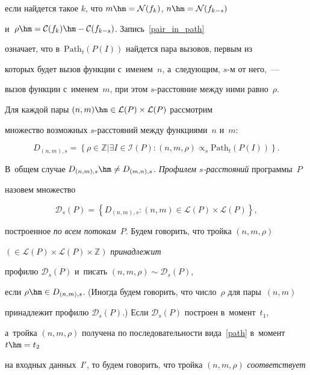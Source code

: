 если найдется такое $k$, что $m\hm=\mathcal{N}(f_k)$, $n\hm=\mathcal{N}(f_{k-s})$ 

и~$\rho\hm=\mathcal{C}(f_{k})\hm-\mathcal{C}(f_{k-s})$. Запись~\eqref{pair_in_path} 

означает, что в~$\mathrm{Path}_t(P(I))$ найдется пара вызовов, первым из 

которых будет вызов функции с~именем~$n$, а~сле\-ду\-ющим, $s$-м от него,~--- 

вызов функции с~именем~$m$, при этом $s$-рас\-сто\-яние между ними равно~$\rho$. 

Для каждой пары $(n,m)\hm\in \mathcal{L}(P)\times \mathcal{L}(P)$ рассмотрим  

 множество возможных $s$-рас\-сто\-яний между функ\-циями~$n$ и~$m$:

$$

D_{(n,m),s}=\left\{\rho\in\mathbb{Z}|\exists I\in\mathcal{I}(P): (n,m,\rho)\propto_s 

\mathrm{Path}_t(P(I))\right\}.

$$

  В~общем случае $D_{(n,m),s}\hm\neq D_{(m,n),s}$. \textit{Профилем $s$-рас\-сто\-яний} программы~$P$ 

 назовем множество 

\begin{equation}

\label{profile}

\mathcal{D}_{s}(P)=\left\{D_{(n,m),s}:(n,m)\in \mathcal{L}(P)\times \mathcal{L}(P)\right\},

\end{equation}

построенное \textit{по всем потокам}~$P$. Будем говорить, что тройка $(n,m,\rho)$\linebreak 

$(\in \mathcal{L}(P)\times\mathcal{L}(P)\times \mathbb{Z})$ \textit{принадлежит} 

профилю $\mathcal{D}_s(P)$ и~писать $(n,m,\rho)\sim\mathcal{D}_s(P)$, 

если  $\rho\hm\in D_{(n,m),s}$. (Иногда будем говорить, что число~$\rho$ для пары~$(n,m)$ 

принадлежит профилю $\mathcal{D}_s(P)$.)  Если $\mathcal{D}_s(P)$ построен в~момент~$t_1$, 

а~тройка $(n,m,\rho)$ получена по последовательности вида~\eqref{path} в~момент $t\hm=t_2$ 

на входных данных~$I'$, то будем говорить, что тройка $(n,m,\rho)$ \textit{соответствует} 

